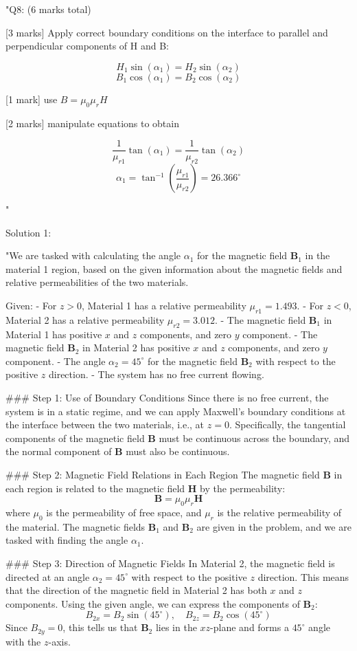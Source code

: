 "{Q8: (6 marks total)}

[3 marks] Apply correct boundary conditions on the interface to parallel and perpendicular components of H and B:

\[ H_1 \sin(\alpha_1) = H_2 \sin(\alpha_2) \]
\[ B_1 \cos(\alpha_1) = B_2 \cos(\alpha_2) \]

[1 mark] use \( B = \mu_0 \mu_r H \)

[2 marks] manipulate equations to obtain 

\[ \frac{1}{\mu_{r1}} \tan(\alpha_1) = \frac{1}{\mu_{r2}} \tan(\alpha_2) \]
\[ \alpha_1 = \tan^{-1}\left ( \frac{\mu_{r1}}{\mu_{r2}} \right ) = 26.366^{\circ} \]

"

Solution 1:

"We are tasked with calculating the angle $\alpha_1$ for the magnetic field $\mathbf{B}_1$ in the material 1 region, based on the given information about the magnetic fields and relative permeabilities of the two materials.

Given:
- For $z > 0$, Material 1 has a relative permeability $\mu_{r1} = 1.493$.
- For $z < 0$, Material 2 has a relative permeability $\mu_{r2} = 3.012$.
- The magnetic field $\mathbf{B}_1$ in Material 1 has positive $x$ and $z$ components, and zero $y$ component.
- The magnetic field $\mathbf{B}_2$ in Material 2 has positive $x$ and $z$ components, and zero $y$ component.
- The angle $\alpha_2 = 45^\circ$ for the magnetic field $\mathbf{B}_2$ with respect to the positive $z$ direction.
- The system has no free current flowing.

### Step 1: Use of Boundary Conditions
Since there is no free current, the system is in a static regime, and we can apply Maxwell's boundary conditions at the interface between the two materials, i.e., at $z = 0$. Specifically, the tangential components of the magnetic field $\mathbf{B}$ must be continuous across the boundary, and the normal component of $\mathbf{B}$ must also be continuous.

### Step 2: Magnetic Field Relations in Each Region
The magnetic field $\mathbf{B}$ in each region is related to the magnetic field $\mathbf{H}$ by the permeability:
\[
\mathbf{B} = \mu_0 \mu_r \mathbf{H}
\]
where $\mu_0$ is the permeability of free space, and $\mu_r$ is the relative permeability of the material. The magnetic fields $\mathbf{B}_1$ and $\mathbf{B}_2$ are given in the problem, and we are tasked with finding the angle $\alpha_1$.

### Step 3: Direction of Magnetic Fields
In Material 2, the magnetic field is directed at an angle $\alpha_2 = 45^\circ$ with respect to the positive $z$ direction. This means that the direction of the magnetic field in Material 2 has both $x$ and $z$ components. Using the given angle, we can express the components of $\mathbf{B}_2$:
\[
B_{2x} = B_2 \sin(45^\circ), \quad B_{2z} = B_2 \cos(45^\circ)
\]
Since $B_{2y} = 0$, this tells us that $\mathbf{B}_2$ lies in the $xz$-plane and forms a $45^\circ$ angle with the $z$-axis.

